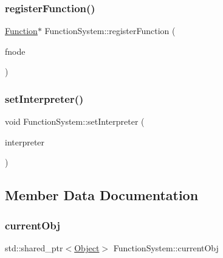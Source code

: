 \subsubsection{\texorpdfstring{register\+Function()}{registerFunction()}\hspace{0.1cm}{\footnotesize\ttfamily [2/2]}}
{\footnotesize\ttfamily \hyperlink{classFunction}{Function}$\ast$ Function\+System\+::register\+Function (\begin{DoxyParamCaption}\item[{\hyperlink{classFunctionNode}{Function\+Node} $\ast$}]{fnode }\end{DoxyParamCaption})}

\mbox{\label{classFunctionSystem_a70175d76b5b377e58b1d3b0eebd1bc0a}} 
\subsubsection{\texorpdfstring{set\+Interpreter()}{setInterpreter()}}
{\footnotesize\ttfamily void Function\+System\+::set\+Interpreter (\begin{DoxyParamCaption}\item[{\hyperlink{classInterpreter}{Interpreter} $\ast$}]{interpreter }\end{DoxyParamCaption})}



\subsection{Member Data Documentation}
\mbox{\label{classFunctionSystem_a59f2a49d91338ced0a79d3898412fcaf}} 
\subsubsection{\texorpdfstring{current\+Obj}{currentObj}}
{\footnotesize\ttfamily std\+::shared\+\_\+ptr$<$\hyperlink{classObject}{Object}$>$ Function\+System\+::current\+Obj}


